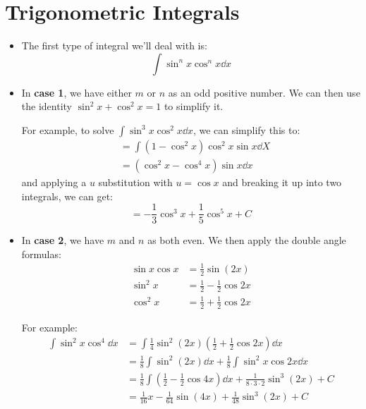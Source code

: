 \section{Trigonometric Integrals}
\begin{itemize}
    \item The first type of integral we'll deal with is:
    \begin{equation}
        \int \sin^nx\cos^nx \dd{x}
    \end{equation}
    \item In \textbf{case 1}, we have either $m$ or $n$ as an odd positive number. We can then use the identity $\sin^2x+\cos^2x=1$ to simplify it.
    \begin{example}
        For example, to solve $\int \sin^3 x \cos^2 x \dd{x}$, we can simplify this to:
        \begin{align}
            &= \int (1-\cos^2x)\cos^2 x \sin x \dd{X} \\ 
            &= (\cos^2x-\cos^4 x)\sin x \dd{x}
        \end{align}
        and applying a $u$ substitution with $u=\cos x$ and breaking it up into two integrals, we can get:
        \begin{equation}
            =-\frac{1}{3}\cos^3 x + \frac{1}{5}\cos^5 x + C
        \end{equation}
    \end{example}
    \item In \textbf{case 2}, we have $m$ and $n$ as both even. We then apply the double angle formulas:
    \begin{align}
        \sin x\cos x &= \frac{1}{2}\sin(2x) \\ 
        \sin^2 x &= \frac{1}{2} - \frac{1}{2}\cos 2x \\ 
        \cos^2 x &= \frac{1}{2} + \frac{1}{2}\cos 2x
    \end{align}
    \begin{example}
        For example:
        \begin{align}
            \int \sin^2 x\cos^4 \dd{x} &= \int \frac{1}{4}\sin^2(2x)\left(\frac{1}{2}+\frac{1}{2}\cos 2x\right) \dd{x} \\ 
            &= \frac{1}{8} \int \sin^2(2x) \dd{x} + \frac{1}{8}\int \sin^2 x\cos 2x \dd{x} \\ 
            &= \frac{1}{8} \int \left(\frac{1}{2} - \frac{1}{2}\cos 4x\right) \dd{x} + \frac{1}{8 \cdot 3 \cdot 2} \sin^3(2x) + C \\
            &= \frac{1}{16}x - \frac{1}{64}\sin(4x) + \frac{1}{48}\sin^3(2x) + C 

\end{align}
\end{example}
\end{itemize}
